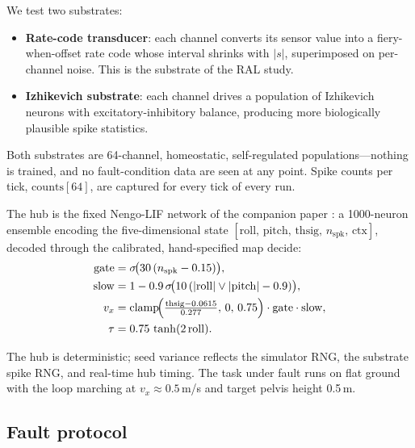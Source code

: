 We test two substrates:
\begin{itemize}
\item \textbf{Rate-code transducer}: each channel converts its sensor value
      into a fiery-when-offset rate code whose interval shrinks with $|s|$,
      superimposed on per-channel noise. This is the substrate of the RAL study.
\item \textbf{Izhikevich substrate}: each channel drives a population of
      Izhikevich neurons \cite{izhikevich2003, izhikevich2004} with
      excitatory-inhibitory balance, producing more biologically plausible
      spike statistics.
\end{itemize}

Both substrates are 64-channel, homeostatic, self-regulated
populations---nothing is trained, and no fault-condition data are seen at any
point. Spike counts per tick, $\mathrm{counts}[64]$, are captured for every
tick of every run.

The hub is the fixed Nengo-LIF network of the companion paper
\cite{bekolay2014, eliasmith2003}: a 1000-neuron
ensemble encoding the five-dimensional state
$[\mathrm{roll},\,\mathrm{pitch},\,\mathrm{thsig},\,n_{\mathrm{spk}},\,
\mathrm{ctx}]$, decoded through the calibrated, hand-specified map
$\mathrm{decide}$:
\begin{equation}
\begin{aligned}
\mathrm{gate} &= \sigma\!\bigl(30\,(n_{\mathrm{spk}} - 0.15)\bigr),\\
\mathrm{slow} &= 1 - 0.9\,\sigma\!\bigl(10\,(\lvert\mathrm{roll}\rvert \vee
\lvert\mathrm{pitch}\rvert - 0.9)\bigr),\\
v_x &= \mathrm{clamp}\!\Bigl(\tfrac{\mathrm{thsig} - 0.0615}{0.277},\,0,\,0.75
\Bigr)\cdot \mathrm{gate}\cdot \mathrm{slow},\\
\tau &= 0.75\,\tanh(2\,\mathrm{roll}).
\end{aligned}
\end{equation}

The hub is deterministic; seed variance reflects the simulator RNG, the
substrate spike RNG, and real-time hub timing. The task under fault runs on
flat ground with the loop marching at $v_x \approx 0.5$\,m/s and target pelvis
height 0.5\,m.

\subsection{Fault protocol}

